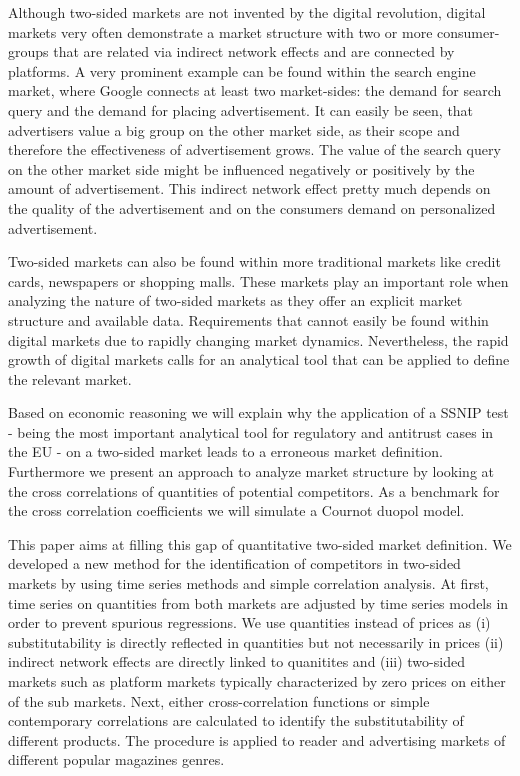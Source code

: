 \documentclass[12pt,a4paper,notitlepage]{article}
\begin{document}
Although two-sided markets are not invented by the digital revolution, digital markets very often demonstrate a market structure with two or more consumer-groups that are related via indirect network effects and are connected by platforms. A very prominent example can be found within the search engine market, where Google connects at least two market-sides: the demand for search query and the demand for placing advertisement. It can easily be seen, that advertisers value a big group on the other market side, as their scope and therefore the effectiveness of advertisement grows. The value of the search query on the other market side might be influenced negatively or positively by the amount of advertisement. This indirect network effect pretty much depends on the quality of the advertisement and on the consumers demand on personalized advertisement.

Two-sided markets can also be found within more traditional markets like credit cards, newspapers or shopping malls. These markets play an important role when analyzing the nature of two-sided markets as they offer an explicit market structure and available data. Requirements that cannot easily be found within digital markets due to rapidly changing market dynamics. Nevertheless, the rapid growth of digital markets calls for an analytical tool that can be applied to define the relevant market.

Based on economic reasoning we will explain why the application of a SSNIP test - being the most important analytical tool for regulatory and antitrust cases in the EU - on a two-sided market leads to a erroneous market definition. Furthermore we present an approach to analyze market structure by looking at the cross correlations of quantities of potential competitors. As a benchmark for the cross correlation coefficients we will simulate a Cournot duopol model. 

This paper aims at filling this gap of quantitative two-sided market definition. We developed a new method for the identification of competitors in two-sided markets by using time series methods and simple correlation analysis. At first, time series on quantities from both markets are adjusted by time series models in order to prevent spurious regressions. We use quantities instead of prices as (i) substitutability is directly reflected in quantities but not necessarily in prices (ii) indirect network effects are directly linked to quanitites  and (iii) two-sided markets such as platform markets typically characterized by zero prices on either of the sub markets. Next, either cross-correlation functions or simple contemporary correlations are calculated to identify the substitutability of different products. The procedure is applied to reader and advertising markets of different popular magazines genres. 
\end{document}
